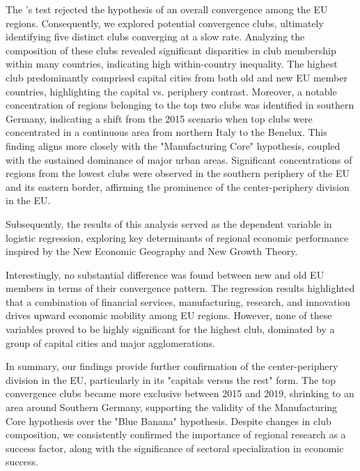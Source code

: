 \documentclass[11pt]{article}
\begin{document}
The \citeauthor{phillips2009economic}'s test rejected the hypothesis of an overall convergence among the EU regions. Consequently, we explored potential convergence clubs, ultimately identifying five distinct clubs converging at a slow rate. Analyzing the composition of these clubs revealed significant disparities in club membership within many countries, indicating high within-country inequality. The highest club predominantly comprised capital cities from both old and new EU member countries, highlighting the capital vs. periphery contrast. Moreover, a notable concentration of regions belonging to the top two clubs was identified in southern Germany, indicating a shift from the 2015 scenario when top clubs were concentrated in a continuous area from northern Italy to the Benelux. This finding aligns more closely with the "Manufacturing Core" hypothesis, coupled with the sustained dominance of major urban areas. Significant concentrations of regions from the lowest clubs were observed in the southern periphery of the EU and its eastern border, affirming the prominence of the center-periphery division in the EU.

Subsequently, the results of this analysis served as the dependent variable in logistic regression, exploring key determinants of regional economic performance inspired by the New Economic Geography and New Growth Theory.

Interestingly, no substantial difference was found between new and old EU members in terms of their convergence pattern. The regression results highlighted that a combination of financial services, manufacturing, research, and innovation drives upward economic mobility among EU regions. However, none of these variables proved to be highly significant for the highest club, dominated by a group of capital cities and major agglomerations.
 
In summary, our findings provide further confirmation of the center-periphery division in the EU, particularly in its "capitals versus the rest" form. The top convergence clubs became more exclusive between 2015 and 2019, shrinking to an area around Southern Germany, supporting the validity of the Manufacturing Core hypothesis over the "Blue Banana" hypothesis. Despite changes in club composition, we consistently confirmed the importance of regional research as a success factor, along with the significance of sectoral specialization in economic success.
\end{document}
